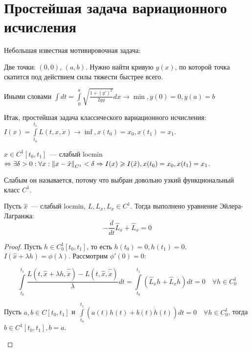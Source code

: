 \documentclass{article}
\begin{document}
\section{Простейшая задача вариационного исчисления}

Небольшая известная мотивировочная задача:
\begin{problem}[1696, о~брахистохроне]
	Две точки: $(0, 0)$, $(a, b)$. Нужно найти кривую $y(x)$, по которой точка
	скатится под действием силы тяжести быстрее всего.

	Иными словами
	$\int dt = \int\limits_0^a \sqrt{\frac{1 + (y')^2}{2gy}}dx \rightarrow \min,
	y(0) = 0, y(a) = b$
\end{problem}

Итак, простейшая задача классического вариационного исчисления: $I(x) =
\int\limits_{t_0}^{t_1} L(t, x, \dot{x}) \rightarrow \inf, x(t_0) = x_0, x(t_1)
= x_1$.

\begin{definition}
	$\hat{x} \in C^1[t_0, t_1]$~--- слабый locmin $\Leftrightarrow \exists \delta
	> 0: \forall x: \left\lVert x - \hat{x}\right\rVert_{C^1} < \delta \Rightarrow I(x) \geqslant
	I(\hat{x}), x(t_0) = x_0, x(t_1) = x_1$.

	Слабым он называется, потому что выбран довольно узкий функциональный класс
	$C^1$.
\end{definition}

\begin{theorem}
	Пусть $\hat{x}$~--- слабый locmin, $L, L_x, L_{\dot{x}} \in C^1$. Тогда
	выполнено уравнение Эйлера-Лагранжа:
	$$ -\frac{d}{dt}\hat{L}_{\dot{x}} + \hat{L}_x = 0 $$
\end{theorem}
\begin{proof}
	Пусть $h \in C_0^1[t_0, t_1]$, то есть $h(t_0) = 0, h(t_1) = 0$. $I(\hat{x} +
	\lambda h) = \phi(\lambda)$. Рассмотрим $\phi'(0) = 0$:

	$$ \int\limits_{t_0}^{t_1} \frac{L(t, \hat{x} + \lambda h, \hat{\dot{x}}) -
	L(t, \hat{x}, \hat{\dot{x}})}{\lambda} dt = \int\limits_{t_0}^{t_1} (\hat{L}_x
	h + \hat{L}_{\dot{x}} \dot{h})dt = 0 \quad\forall h \in C_0^1$$

	\begin{lemma}
		Пусть $a, b \in C[t_0, t_1]$ и~$\int\limits_{t_0}^{t_1} (a(t)h(t) +
		b(t)\dot{h}(t))dt = 0 \quad \forall h \in C_0^1$, тогда $b \in C^1[t_0,
		t_1], \dot{b} = a$.
	\end{lemma}
\end{proof}
\end{document}
